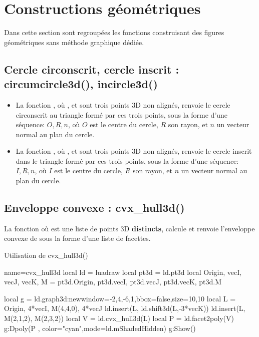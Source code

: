 \section{Constructions géométriques}

Dans cette section sont regroupées les fonctions construisant des figures géométriques sans méthode graphique dédiée.

\subsection{Cercle circonscrit, cercle inscrit : circumcircle3d(), incircle3d()}

\begin{itemize}
    \item La fonction , où ,  et  sont trois points 3D non alignés, renvoie le cercle circonscrit au triangle formé par ces trois points, sous la forme d'une séquence: $O,R,n$, où $O$ est le centre du cercle, $R$ son rayon, et $n$ un vecteur normal au plan du cercle.
    \item La fonction , où ,  et  sont trois points 3D non alignés, renvoie le cercle inscrit dans le triangle formé par ces trois points, sous la forme d'une séquence: $I,R,n$, où $I$ est le centre du cercle, $R$ son rayon, et $n$ un vecteur normal au plan du cercle.    
\end{itemize}

\subsection{Enveloppe convexe : cvx\_hull3d()}

La fonction  où  est une liste de points 3D \textbf{distincts}, calcule et renvoie l'enveloppe convexe de  sous la forme d'une liste de facettes.

\begin{demo}{Utilisation de cvx\_hull3d()}
\begin{luadraw}{name=cvx_hull3d}
local ld = luadraw
local pt3d = ld.pt3d
local Origin, vecI, vecJ, vecK, M = pt3d.Origin, pt3d.vecI, pt3d.vecJ, pt3d.vecK, pt3d.M

local g = ld.graph3d:new{window={-2,4,-6,1},bbox=false,size={10,10}}
local L = {Origin, 4*vecI, M(4,4,0), 4*vecJ}
ld.insert(L, ld.shift3d(L,-3*vecK))
ld.insert(L, {M(2,1,2), M(2,3,2)})
local V = ld.cvx_hull3d(L)
local P = ld.facet2poly(V)
g:Dpoly(P , {color="cyan",mode=ld.mShadedHidden})
g:Show()
\end{luadraw}
\end{demo}

